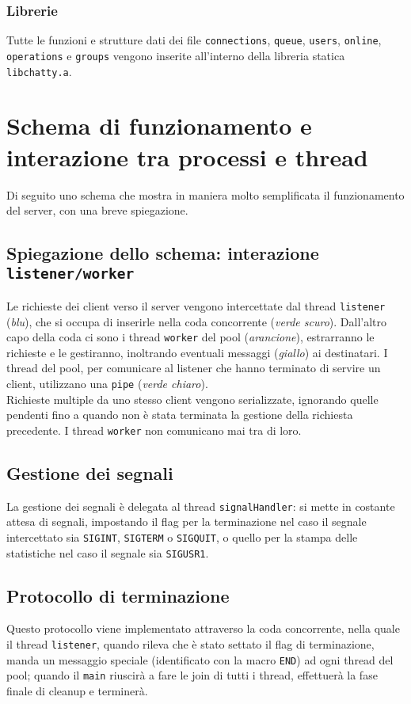 \documentclass{article}
\begin{document}
\subsubsection{Librerie}
Tutte le funzioni e strutture dati dei file \texttt{connections}, \texttt{queue}, \texttt{users}, \texttt{online}, \texttt{operations} e \texttt{groups} vengono inserite all'interno della libreria statica \texttt{libchatty.a}.


\section{Schema di funzionamento e interazione tra processi e thread}
Di seguito uno schema che mostra in maniera molto semplificata il funzionamento del server, con una breve spiegazione.\\

\subsection{Spiegazione dello schema: interazione \texttt{listener/worker}}
Le richieste dei client verso il server vengono intercettate dal thread \texttt{listener} (\textit{blu}), che si occupa di inserirle nella coda concorrente (\textit{verde scuro}). Dall'altro capo della coda ci sono i thread \texttt{worker} del pool (\textit{arancione}), estrarranno le richieste e le gestiranno, inoltrando eventuali messaggi (\textit{giallo}) ai destinatari. I thread del pool, per comunicare al listener che hanno terminato di servire un client, utilizzano una \texttt{pipe} (\textit{verde chiaro}).\\
Richieste multiple da uno stesso client vengono serializzate, ignorando quelle pendenti fino a quando non è stata terminata la gestione della richiesta precedente. I thread \texttt{worker} non comunicano mai tra di loro.

\subsection{Gestione dei segnali}
La gestione dei segnali è delegata al thread \texttt{signalHandler}: si mette in costante attesa di segnali, impostando il flag per la terminazione nel caso il segnale intercettato sia \texttt{SIGINT}, \texttt{SIGTERM} o \texttt{SIGQUIT}, o quello per la stampa delle statistiche nel caso il segnale sia \texttt{SIGUSR1}.

\subsection{Protocollo di terminazione}
Questo protocollo viene implementato attraverso la coda concorrente, nella quale il thread \texttt{listener}, quando rileva che è stato settato il flag di terminazione, manda un messaggio speciale (identificato con la macro \texttt{END}) ad ogni thread del pool; quando il \texttt{main} riuscirà a fare le join di tutti i thread, effettuerà la fase finale di cleanup e terminerà.
\end{document}
